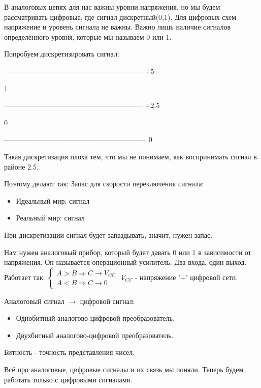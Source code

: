 В аналоговых цепях для нас важны уровни напряжения, но мы будем рассматривать цифровые, где сигнал дискретный(0,1). Для цифровых схем напряжение
и уровень сигнала не важны. Важно лишь наличие сигналов определённого уровня, которые мы называем 0 или 1.

Попробуем дискретизировать сигнал:

\begin{center}
----------------------------------------------------------- +5

1

----------------------------------------------------------- +2.5

0

------------------------------------------------------------ 0\end{center}

Такая дискретизация плоха тем, что мы не понимаем, как воспринимать сигнал в районе 2.5.

Поэтому делают так:  Запас для скорости переключения сигнала:
\begin{itemize}
	\item Идеальный мир: сигнал 
	\item Реальный мир: сигнал 
\end{itemize}

При дискретизации сигнал будет запаздывать, значит, нужен запас.

Нам нужен аналоговый прибор, который будет давать 0 или 1 в зависимости от напряжения. Он называется операционный усилитель. 
Два входа, один выход. 
Работает так: $\begin{cases} A > B \Rightarrow C \rightarrow V_{CC} \\
										 A < B \Rightarrow C \rightarrow 0\end{cases}$ $V_{CC}$ - напряжение '+' цифровой сети.

Аналоговый сигнал $\rightarrow$ цифровой сигнал:
\begin{itemize}
	\item Однобитный аналогово-цифровой преобразователь. 
	\item Двухбитный аналогово-цифровой преобразователь. 
\end{itemize}

Битность - точность представления чисел.

Всё про аналоговые, цифровые сигналы и их связь мы поняли. Теперь будем работать только с цифровыми сигналами.

